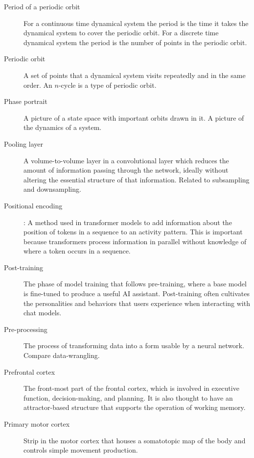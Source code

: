 \begin{description}
\item[Period of a periodic orbit] For a continuous time dynamical system the period is the time it takes the dynamical system to cover the periodic orbit. For a discrete time dynamical system the period is the number of points in the periodic orbit.

\item[Periodic orbit] A set of points that a dynamical system visits repeatedly and in the same order. An $n$-cycle is a type of periodic orbit.

\item[Phase portrait] A picture of a state space with important orbits drawn in it. A picture of the dynamics of a system.

\item[Pooling layer] A volume-to-volume layer in a convolutional layer which reduces the amount of information passing through the network, ideally without altering the essential structure of that information. Related to subsampling and downsampling. 

\item[Positional encoding]: A method used in transformer models to add information about the position of tokens in a sequence to an activity pattern. This is important because transformers process information in parallel without knowledge of where a token occurs in a sequence.

\item[Post-training] The phase of model training that follows pre-training, where a base model is fine-tuned to produce a useful AI assistant. Post-training often cultivates the personalities and behaviors that users experience when interacting with chat models.

\item[Pre-processing] The process of transforming data into a form usable by a neural network. Compare data-wrangling.


\item[Prefrontal cortex] The front-most part of the frontal cortex, which is involved in executive function, decision-making, and planning. It is also thought to have an attractor-based structure that supports the operation of working memory.

\item[Primary motor cortex] Strip in the motor cortex that houses a somatotopic map of the body and controls simple movement production. 


\end{description}
